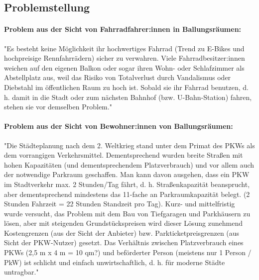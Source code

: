 \subsection{Problemstellung}

\paragraph{Problem aus der Sicht von Fahrradfahrer:innen in Ballungsräumen:}
"Es besteht keine Möglichkeit ihr hochwertiges Fahrrad (Trend zu E-Bikes und hochpreisige Rennfahrrädern) sicher zu verwahren. Viele Fahrradbesitzer:innen weichen auf den eigenen Balkon oder sogar ihren Wohn- oder Schlafzimmer als Abstellplatz aus, weil das Risiko von Totalverlust durch Vandalismus oder Diebstahl im öffentlichen Raum zu hoch ist. Sobald sie ihr Fahrrad benutzen, d. h. damit in die Stadt oder zum nächsten Bahnhof (bzw. U-Bahn-Station) fahren, stehen sie vor demselben Problem." \cite{ltw_problemstellung}

\paragraph{Problem aus der Sicht von Bewohner:innen von Ballungsräumen:}
"Die Städteplanung nach dem 2. Weltkrieg stand unter dem Primat des PKWs als dem vorrangigen Verkehrsmittel. Dementsprechend wurden breite Straßen mit hohen Kapazitäten (und dementsprechendem Platzverbrauch) und vor allem auch der notwendige Parkraum geschaffen. Man kann davon ausgehen, dass ein PKW im Stadtverkehr max. 2 Stunden/Tag fährt, d. h. Straßenkapazität beansprucht, aber dementsprechend mindestens das 11-fache an Parkraumkapazität belegt. (2 Stunden Fahrzeit = 22 Stunden Standzeit pro Tag). Kurz- und mittelfristig wurde versucht, das Problem mit dem Bau von Tiefgaragen und Parkhäusern zu lösen, aber mit steigenden Grundstückspreisen wird dieser Lösung zunehmend Kostengrenzen (aus der Sicht der Anbieter) bzw. Parkticketpreisgrenzen (aus Sicht der PKW-Nutzer) gesetzt. Das Verhältnis zwischen Platzverbrauch eines PKWs (2,5 m x 4 m = 10 qm?) und beförderter Person (meistens nur 1 Person / PkW) ist schlicht und einfach unwirtschaftlich, d. h. für moderne Städte untragbar." \cite{ltw_problemstellung}
